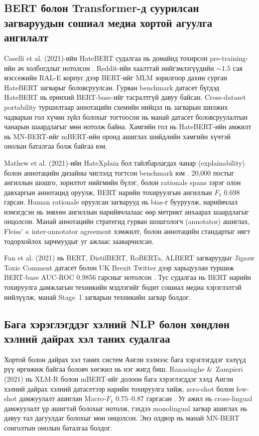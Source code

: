 \subsection{BERT болон Transformer-д суурилсан загваруудын сошиал медиа хортой агуулга ангилалт}

Caselli et al. (2021)-ийн HateBERT судалгаа нь домайнд тохирсон pre-training-ийн
ач холбогдлыг нотолсон \cite{caselli2021}. Reddit-ийн хаалттай нийгэмлэгүүдийн
${\sim}1.5$ сая мэссежийн RAL-E корпус дээр BERT-ийг MLM зорилгоор дахин сурган
HateBERT загварыг боловсруулсан. Гурван benchmark датасет бүгдэд HateBERT нь
ерөнхий BERT-base-ийг тасралтгүй давуу байсан. Cross-dataset portability
туршилтаар аннотацийн схемийн нийцэл нь загварын шилжих чадварын гол хүчин
зүйл болохыг тогтоосон нь манай датасет боловсруулалтын чанарын шаардлагыг мөн
нотолж байна. Хамгийн гол нь HateBERT-ийн амжилт нь MN-BERT-ийг mBERT-ийн
оронд ашиглах шийдлийн хамгийн хүчтэй онолын баталгаа болж байгаа юм.

Mathew et al. (2021)-ийн HateXplain бол тайлбарлагдах чанар (explainability)
болон аннотацийн дизайны чиглэлд тогтсон benchmark юм \cite{mathew2021}. 20,000
постыг ангиллын шошго, зорилтот нийгмийн бүлэг, болон rationale spans зэрэг
олон давхаргын аннотацид оруулж, BERT нарийн тохируулгын ангиллын $F_1$ 0.698
гарсан. Human rationale оруулсан загварууд нь bias-г бууруулж, нарийвчлал
нэмэгдсэн нь зөвхөн ангиллын нарийвчлалаас өөр метрикт анхаарах шаардлагыг
онцолсон. Манай аннотацийн стратегид гурван шошгологч (annotator) ашиглах, Fleiss' $\kappa$
inter-annotator agreement хэмжилт, болон аннотацийн стандартыг нягт тодорхойлох
зарчмуудыг уг ажлаас зааварчилсан.

Fan et al. (2021) нь BERT, DistilBERT, RoBERTa, ALBERT загваруудыг Jigsaw
Toxic Comment датасет болон UK Brexit Twitter дээр харьцуулан туршиж
BERT-base AUC-ROC 0.9856 гарсныг нотолсон \cite{fan2021toxic}. Тус судалгаа нь
BERT нарийн тохируулга дамжлагын техникийн мэдлэгийг бодит сошиал медиа
хэрэглэлтэй нийлүүлж, манай Stage~1 загварын техникийн загвар болдог.

\subsection{Бага хэрэглэгддэг хэлний NLP болон хөндлөн хэлний дайрах хэл
таних судалгаа}

Хортой болон дайрах хэл таних систем Англи хэлнээс бага хэрэглэгддэг хэлүүд
рүү өргөжиж байгаа боловч хөгжил нь нэг жигд биш. Ranasinghe \&\ Zampieri
(2021) нь XLM-R болон mBERT-ийг долоон бага хэрэглэгддэг хэлд Англи хэлний
дайрах хэлний датасетээр нарийн тохируулга хийж, zero-shot болон few-shot дамжуулалт
ашиглан Macro-$F_1$ $0.75$--$0.87$ гаргасан \cite{ranasinghe2021}. Уг ажил нь cross-lingual дамжуулалт үр ашигтай болохыг нотолж, гэхдээ
monolingual загвар ашиглах нь давуу тал дагуулдаг болохыг мөн онцолсон.
Энэ олдвор нь манай MN-BERT сонголтын онолын баталгаа болдог.

